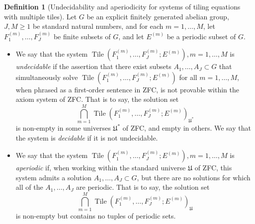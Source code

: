 \documentclass[reqno,a4paper,12pt]{amsart}
\numberwithin{equation}{section}
\numberwithin{figure}{section}
\renewcommand\geq{\geqslant}
\newcommand{\Tile}{\operatorname{Tile}}
\newcommand{\Universe}{{\mathfrak{U}}}
\theoremstyle{plain}
\theoremstyle{definition}
\newtheorem{definition}[thm]{Definition}
\begin{document}
\begin{definition}[Undecidability and aperiodicity for systems of tiling equations with multiple tiles]\label{undecide-system}  Let $G$ be an explicit finitely generated abelian group, $J, M \geq 1$ be standard natural numbers, and for each $m=1,\dots,M$, let $F^{(m)}_1,\dots,F^{(m)}_J$ be finite subsets of $G$, and let $E^{(m)}$ be a periodic subset of $G$.
\begin{itemize}
\item[(i)]  We say that the system $\Tile(F^{(m)}_1,\dots,F^{(m)}_J;E^{(m)}), m=1,\dots,M$ is \emph{undecidable} if the assertion that there exist subsets $A_1,\dots,A_J \subset G$ that simultaneously solve  $\Tile(F^{(m)}_1,\dots,F^{(m)}_J;E^{(m)})$ for all $m=1,\dots,M$, when phrased as a first-order sentence in ZFC, is not provable within the axiom system of ZFC.  That is to say, the solution set
$$ \bigcap_{m=1}^M \Tile(F^{(m)}_1,\dots,F^{(m)}_J;E^{(m)})_{\Universe^*}$$
is non-empty in some universes $\Universe^*$ of ZFC, and empty in others.  We say that the system is \emph{decidable} if it is not undecidable.
\item[(ii)]  We say that the system
$\Tile(F^{(m)}_1,\dots,F^{(m)}_J;E^{(m)}), m=1,\dots,M$ is \emph{aperiodic} if, when working within the standard universe $\Universe$ of ZFC, this system admits a solution $A_1,\dots,A_J \subset G$, but there are no solutions for which all of the $A_1,\dots,A_J$ are periodic. That is to say, the solution set
$$ \bigcap_{m=1}^M \Tile(F^{(m)}_1,\dots,F^{(m)}_J;E^{(m)})_{\Universe}$$
is non-empty but contains no tuples of periodic sets.
\end{itemize}
\end{definition}
\end{document}
